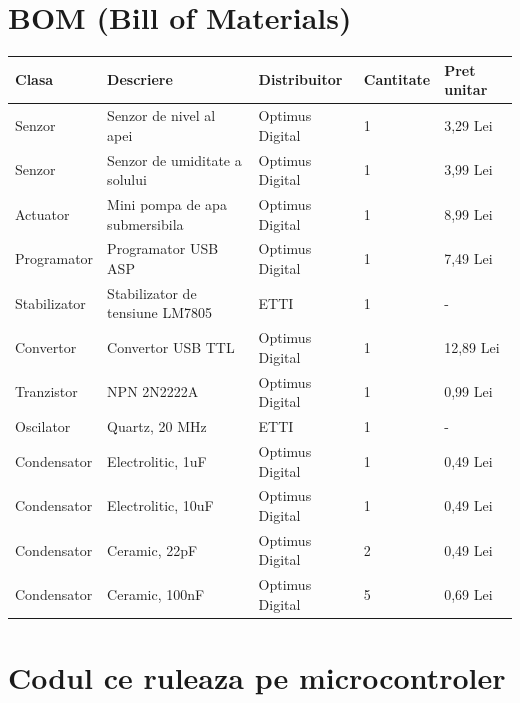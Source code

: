 \documentclass[12pt]{article}
\begin{document}
\section{ BOM (Bill of Materials)}


\begin{table}[H]
\begin{tabular}{|l|l|l|l|l|}
\hline
Clasa & Descriere & Distribuitor & Cantitate & Pret unitar  \\ \hline
Senzor & Senzor de nivel al apei & Optimus Digital & 1 & 3,29 Lei \\ \hline
Senzor & Senzor de umiditate a solului & Optimus Digital & 1 & 3,99 Lei \\ \hline
Actuator & Mini pompa de apa submersibila & Optimus Digital & 1 & 8,99 Lei\\ \hline
Programator & Programator USB ASP & Optimus Digital & 1 & 7,49 Lei\\ \hline
Stabilizator & Stabilizator de tensiune LM7805 & ETTI & 1 & - \\ \hline
Convertor & Convertor USB TTL & Optimus Digital & 1 & 12,89 Lei\\ \hline
Tranzistor & NPN 2N2222A & Optimus Digital & 1 & 0,99 Lei\\ \hline
Oscilator & Quartz, 20 MHz & ETTI & 1 & -\\ \hline
Condensator & Electrolitic, 1uF & Optimus Digital & 1 & 0,49 Lei\\ \hline
Condensator & Electrolitic, 10uF &Optimus Digital  & 1 & 0,49 Lei\\ \hline
Condensator & Ceramic, 22pF &Optimus Digital  & 2 & 0,49 Lei\\ \hline
Condensator & Ceramic, 100nF & Optimus Digital & 5 & 0,69 Lei\\ \hline
\end{tabular}
\end{table}

\newpage

\section{ Codul ce ruleaza pe microcontroler}
\end{document}
